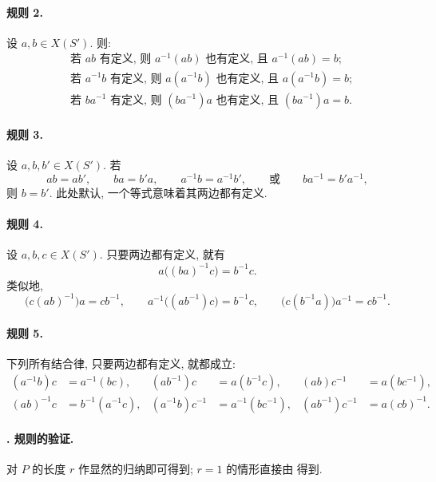 \paragraph{规则 2.}
设 \(a,b\in X(S')\). 则:
\begin{align*}
  &\text{若 \(ab\) 有定义, 则 \(a^{-1}(ab)\) 也有定义, 且 }
    a^{-1}(ab)=b;\\
  &\text{若 \(a^{-1}b\) 有定义, 则 \(a(a^{-1}b)\) 也有定义, 且 }
    a(a^{-1}b)=b;\\
  &\text{若 \(ba^{-1}\) 有定义, 则 \((ba^{-1})a\) 也有定义, 且 }
    (ba^{-1})a=b.
\end{align*}

\paragraph{规则 3.}
设 \(a,b,b'\in X(S')\). 若
\[
  ab=ab',\qquad ba=b'a,\qquad a^{-1}b=a^{-1}b',
  \qquad\text{或}\qquad ba^{-1}=b'a^{-1},
\]
则 \(b=b'\). 此处默认, 一个等式意味着其两边都有定义.

\paragraph{规则 4.}
设 \(a,b,c\in X(S')\). 只要两边都有定义, 就有
\[
  a\bigl((ba)^{-1}c\bigr)=b^{-1}c.
\]
类似地,
\[
  \bigl(c(ab)^{-1}\bigr)a=cb^{-1},\qquad
  a^{-1}\bigl((ab^{-1})c\bigr)=b^{-1}c,\qquad
  \bigl(c(b^{-1}a)\bigr)a^{-1}=cb^{-1}.
\]

\paragraph{规则 5.}
下列所有结合律, 只要两边都有定义, 就都成立:
\[
\begin{aligned}
  (a^{-1}b)c&=a^{-1}(bc),&
  (ab^{-1})c&=a(b^{-1}c),&
  (ab)c^{-1}&=a(bc^{-1}),\\
  (ab)^{-1}c&=b^{-1}(a^{-1}c),&
  (a^{-1}b)c^{-1}&=a^{-1}(bc^{-1}),&
  (ab^{-1})c^{-1}&=a(cb)^{-1}.
\end{aligned}
\]

\paragraph{.
规则的验证.}
\textup{} 对 \(P\) 的长度 \(r\)
作显然的归纳即可得到; \(r=1\) 的情形直接由 得到.

